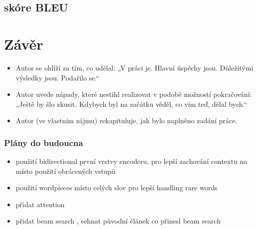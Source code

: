 \section{skóre BLEU}

\chapter{Závěr}
\begin{itemize}
  \item Autor se ohlíží za tím, co udělal: „V práci je. Hlavní úspěchy jsou. Důležitými výsledky jsou. Podařilo se.“
  \item Autor uvede nápady, které nestihl realizovat v podobě možností pokračování: „Ještě by šlo zkusit. Kdybych byl na začátku věděl, co vím teď, dělal bych.“
  \item Autor (ve vlastním zájmu) rekapituluje, jak bylo naplněno zadání práce.
\end{itemize}

\subsection{Plány do budoucna}
\begin{itemize}
    \item použití bidirectional první vrstvy encoderu, pro lepší zachování contextu \cite{googleBridgingGap} na místo použití obrácených vstupů
    \item použití wordpieces \cite{googleBridgingGap} místo celých slov pro lepší handling rare words
    \item přidat attention \cite{attention}
    \item přidat beam search \cite{nmtTutorial}, sehnat původní článek co přinesl beam search
\end{itemize}
